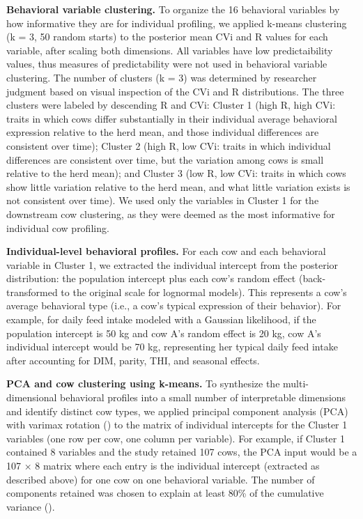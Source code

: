 \documentclass[
]{article}
\begin{document}
\textbf{Behavioral variable clustering.} To organize the 16 behavioral
variables by how informative they are for individual profiling, we
applied k-means clustering (k = 3, 50 random starts) to the posterior
mean CVi and R values for each variable, after scaling both dimensions.
All variables have low predictaibility values, thus measures of
predictability were not used in behavioral variable clustering. The
number of clusters (k = 3) was determined by researcher judgment based
on visual inspection of the CVi and R distributions. The three clusters
were labeled by descending R and CVi: Cluster 1 (high R, high CVi:
traits in which cows differ substantially in their individual average
behavioral expression relative to the herd mean, and those individual
differences are consistent over time); Cluster 2 (high R, low CVi:
traits in which individual differences are consistent over time, but the
variation among cows is small relative to the herd mean); and Cluster 3
(low R, low CVi: traits in which cows show little variation relative to
the herd mean, and what little variation exists is not consistent over
time). We used only the variables in Cluster 1 for the downstream cow
clustering, as they were deemed as the most informative for individual
cow profiling.

\textbf{Individual-level behavioral profiles.} For each cow and each
behavioral variable in Cluster 1, we extracted the individual intercept
from the posterior distribution: the population intercept plus each
cow's random effect (back-transformed to the original scale for
lognormal models). This represents a cow's average behavioral type
(i.e., a cow's typical expression of their behavior). For example, for
daily feed intake modeled with a Gaussian likelihood, if the population
intercept is 50 kg and cow A's random effect is 20 kg, cow A's
individual intercept would be 70 kg, representing her typical daily feed
intake after accounting for DIM, parity, THI, and seasonal effects.

\textbf{PCA and cow clustering using k-means.} To synthesize the
multi-dimensional behavioral profiles into a small number of
interpretable dimensions and identify distinct cow types, we applied
principal component analysis (PCA) with varimax rotation
() to the matrix of
individual intercepts for the Cluster 1 variables (one row per cow, one
column per variable). For example, if Cluster 1 contained 8 variables
and the study retained 107 cows, the PCA input would be a 107 × 8 matrix
where each entry is the individual intercept (extracted as described
above) for one cow on one behavioral variable. The number of components
retained was chosen to explain at least 80\% of the cumulative variance
().
\end{document}
